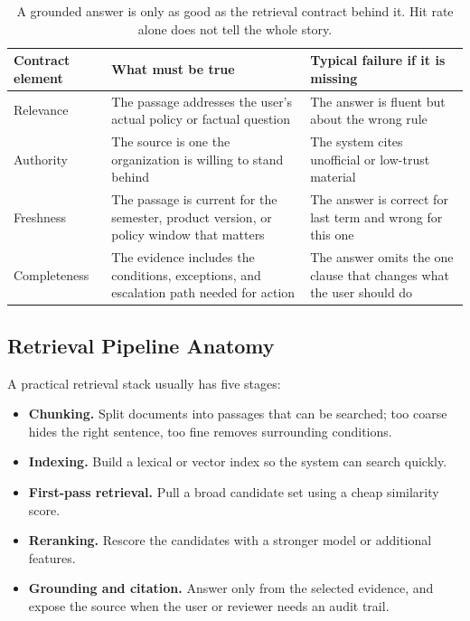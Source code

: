 \begin{table}[t]
\centering
\small
\setlength{\tabcolsep}{4pt}
\begin{tabular}{p{2.32cm}p{3.32cm}p{4.31cm}}
\toprule
Contract element & What must be true & Typical failure if it is missing \\
\midrule
Relevance & The passage addresses the user's actual policy or factual question & The answer is fluent but about the wrong rule \\
Authority & The source is one the organization is willing to stand behind & The system cites unofficial or low-trust material \\
Freshness & The passage is current for the semester, product version, or policy window that matters & The answer is correct for last term and wrong for this one \\
Completeness & The evidence includes the conditions, exceptions, and escalation path needed for action & The answer omits the one clause that changes what the user should do \\
\bottomrule
\end{tabular}
\caption{A grounded answer is only as good as the retrieval contract behind it. Hit rate alone does not tell the whole story.}
\label{tab:retrieval-contract}
\end{table}

\subsection{Retrieval Pipeline Anatomy}

A practical retrieval stack usually has five stages:
\begin{itemize}[leftmargin=*]
\item \textbf{Chunking.} Split documents into passages that can be searched; too coarse hides the right sentence, too fine removes surrounding conditions.
\item \textbf{Indexing.} Build a lexical or vector index so the system can search quickly.
\item \textbf{First-pass retrieval.} Pull a broad candidate set using a cheap similarity score.
\item \textbf{Reranking.} Rescore the candidates with a stronger model or additional features.
\item \textbf{Grounding and citation.} Answer only from the selected evidence, and expose the source when the user or reviewer needs an audit trail.
\end{itemize}

